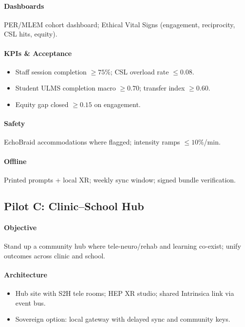 \documentclass[11pt]{article}
\theoremstyle{plain}
\begin{document}
\paragraph{Dashboards}
PER/MLEM cohort dashboard; Ethical Vital Signs (engagement, reciprocity, CSL hits, equity).

\paragraph{KPIs \& Acceptance}
\begin{itemize}
  \item Staff session completion $\ge 75\%$; CSL overload rate $\le 0.08$.
  \item Student ULMS completion macro $\ge 0.70$; transfer index $\ge 0.60$.
  \item Equity gap closed $\ge 0.15$ on engagement.
\end{itemize}

\paragraph{Safety}
EchoBraid accommodations where flagged; intensity ramps $\le 10\%$/min.

\paragraph{Offline}
Printed prompts + local XR; weekly sync window; signed bundle verification.

\subsection{Pilot C: Clinic–School Hub}\label{pilot:hub}
\paragraph{Objective}
Stand up a community hub where tele-neuro/rehab and learning co-exist; unify outcomes across clinic and school.

\paragraph{Architecture}
\begin{itemize}
  \item Hub site with S2H tele rooms; HEP XR studio; shared Intrinsica link via event bus.
  \item Sovereign option: local gateway with delayed sync and community keys.
\end{itemize}
\end{document}

